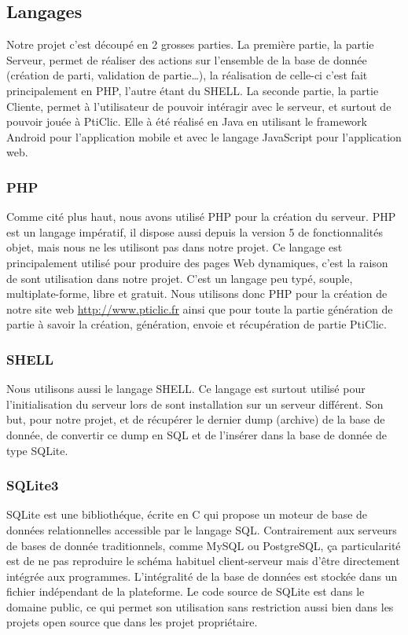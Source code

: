 \documentclass[a4paper,11pt,french]{article}
\def\android{Android\texttrademark{}}
\begin{document}
{\subsection{Langages}
Notre projet c'est découpé en 2 grosses parties. La première partie, la \og{}partie Serveur\fg{}, permet de réaliser des actions sur l'ensemble de la base de donnée (création de parti, validation de partie\ldots),
la réalisation de celle-ci c'est fait principalement en PHP, l'autre étant du SHELL.
La seconde partie, la \og{}partie Cliente\fg{}, permet à l'utilisateur de pouvoir intéragir avec le serveur, et surtout de pouvoir jouée à PtiClic. Elle à été réalisé en Java en utilisant le framework \android{} pour l'application mobile et avec le langage JavaScript pour l'application web.

\subsubsection{PHP}
Comme cité plus haut, nous avons utilisé PHP pour la création du serveur. PHP est un langage impératif, il dispose aussi depuis la version 5 de fonctionnalités objet, mais nous ne les utilisont pas dans notre projet. Ce langage est
principalement utilisé pour produire des pages Web dynamiques, c'est la raison de sont utilisation dans notre projet. C'est un langage peu typé, souple, multiplate-forme, libre et gratuit.
Nous utilisons donc PHP pour la création de notre site web \url{http://www.pticlic.fr} ainsi que pour toute la partie génération de partie à savoir la création, génération, envoie et récupération de partie PtiClic.

\subsubsection{SHELL}
Nous utilisons aussi le langage SHELL. Ce langage est surtout utilisé pour l'initialisation du serveur lors de sont installation sur un serveur différent. Son but, pour notre projet, et de récupérer le dernier dump (archive) de la base de donnée, de convertir ce dump en SQL et de l'insérer dans la base de donnée de type SQLite.

\subsubsection{SQLite3}
SQLite est une bibliothéque, écrite en C qui propose un moteur de base de données relationnelles accessible par le langage SQL. Contrairement aux serveurs de bases de donnée traditionnels, comme MySQL ou PostgreSQL, ça particularité est de ne pas reproduire le schéma habituel client-serveur mais d'être directement intégrée aux programmes. L'intégralité de la base de données est stockée dans un fichier indépendant de la plateforme. Le code source de SQLite est dans le domaine public, ce qui permet son utilisation sans restriction aussi bien dans les projets open source que dans les projet propriétaire.

}
\end{document}
